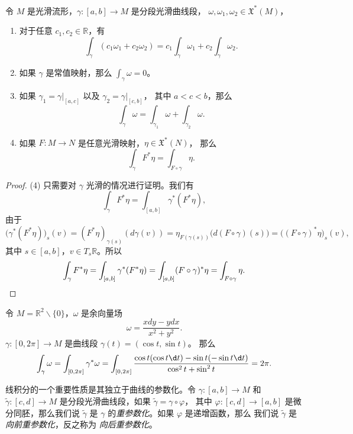 \begin{proposition}[线积分的性质]
  令 $M$ 是光滑流形，$\gamma:[a,b]\to M$ 是分段光滑曲线段，
  $\omega,\omega_1,\omega_2\in \mathfrak{X}^*(M)$，
  \begin{enumerate}
    \item 对于任意 $c_1,c_2\in \mathbb{R}$，有
    \[
      \int_\gamma(c_1\omega_1+c_2\omega_2)=c_1\int_\gamma\omega_1+
      c_2\int_\gamma\omega_2.  
    \]
    \item 如果 $\gamma$ 是常值映射，那么 $\int_\gamma\omega=0$。
    \item 如果 $\gamma_1=\gamma|_{[a,c]}$ 以及 $\gamma_2=\gamma|_{[c,b]}$，
    其中 $a<c<b$，那么
    \[
      \int_\gamma\omega=\int_{\gamma_1} \omega+\int_{\gamma_2}\omega.
    \]
    \item 如果 $F:M\to N$ 是任意光滑映射，$\eta\in \mathfrak{X}^*(N)$，
    那么
    \[
      \int_\gamma F^*\eta=\int_{F\circ\gamma}\eta.  
    \]
  \end{enumerate}
\end{proposition}
\begin{proof}
  (4) 只需要对 $\gamma$ 光滑的情况进行证明。我们有
  \[
    \int_\gamma F^*\eta=  \int_{[a,b]}\gamma^*(F^*\eta),
  \]
  由于
  \[
    \bigl(\gamma^*(F^*\eta)\bigr)_s(v)=
    (F^*\eta)_{\gamma(s)}(d\gamma(v))=
    \eta_{F(\gamma(s))}\bigl(d(F\circ\gamma)(s)\bigr)
    =\bigl((F\circ\gamma)^*\eta\bigr)_s(v),
  \]
  其中 $s\in[a,b]$，$v\in T_s \mathbb{R}$。所以
  \[
    \int_\gamma F^*\eta=  \int_{[a,b]}\gamma^*(F^*\eta)
    =\int_{[a,b]}(F\circ\gamma)^*\eta=\int_{F\circ\gamma}\eta.\qedhere
  \]
\end{proof}

\begin{example}\label{exa:covector field on R2-0}
  令 $M=\mathbb{R}^2 \smallsetminus\{0\}$，$\omega$ 是余向量场
  \[
    \omega=\frac{xdy-ydx}{x^2+y^2}.  
  \]
  $\gamma:[0,2\pi]\to M$ 是曲线段 $\gamma(t)=(\cos t,\sin t)$。
  那么
  \[
    \int_\gamma\omega=\int_{[0,2\pi]}\gamma^*\omega=
    \int_{[0,2\pi]}\frac{\cos t(\cos t\d t)-\sin t(-\sin t\d t)}{\cos^2 t+\sin ^2t} 
    =2\pi. 
  \]
\end{example}

线积分的一个重要性质是其独立于曲线的参数化。令 $\gamma:[a,b]\to M$
和 $\tilde\gamma:[c,d]\to M$ 是分段光滑曲线段，如果 $\tilde\gamma=\gamma\circ\varphi$，
其中 $\varphi:[c,d]\to [a,b]$ 是微分同胚，那么我们说 $\tilde{\gamma}$
是 $\gamma$ 的\emph{重参数化}。如果 $\varphi$ 是递增函数，那么
我们说 $\tilde{\gamma}$ 是\emph{向前重参数化}，反之称为%
\emph{向后重参数化}。


